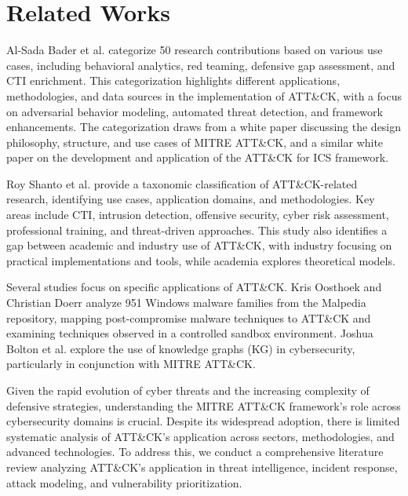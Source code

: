 \section{Related Works}
Al-Sada Bader et al. \cite{al2024mitre} categorize 50 research contributions based on various use cases, including behavioral analytics, red teaming, defensive gap assessment, and CTI enrichment. This categorization highlights different applications, methodologies, and data sources in the implementation of ATT\&CK, with a focus on adversarial behavior modeling, automated threat detection, and framework enhancements. The categorization draws from a white paper \cite{strom2018mitre} discussing the design philosophy, structure, and use cases of MITRE ATT\&CK, and a similar white paper \cite{alexander2020mitre} on the development and application of the ATT\&CK for ICS framework.

Roy Shanto et al. \cite{roy2023sok} provide a taxonomic classification of ATT\&CK-related research, identifying use cases, application domains, and methodologies. Key areas include CTI, intrusion detection, offensive security, cyber risk assessment, professional training, and threat-driven approaches. This study also identifies a gap between academic and industry use of ATT\&CK, with industry focusing on practical implementations and tools, while academia explores theoretical models.

Several studies focus on specific applications of ATT\&CK. Kris Oosthoek and Christian Doerr \cite{oosthoek2019sok} analyze 951 Windows malware families from the Malpedia repository, mapping post-compromise malware techniques to ATT\&CK and examining techniques observed in a controlled sandbox environment. Joshua Bolton et al. \cite{bolton2023overview} explore the use of knowledge graphs (KG) in cybersecurity, particularly in conjunction with MITRE ATT\&CK.

Given the rapid evolution of cyber threats and the increasing complexity of defensive strategies, understanding the MITRE ATT\&CK framework's role across cybersecurity domains is crucial. Despite its widespread adoption, there is limited systematic analysis of ATT\&CK’s application across sectors, methodologies, and advanced technologies. To address this, we conduct a comprehensive literature review analyzing ATT\&CK’s application in threat intelligence, incident response, attack modeling, and vulnerability prioritization.